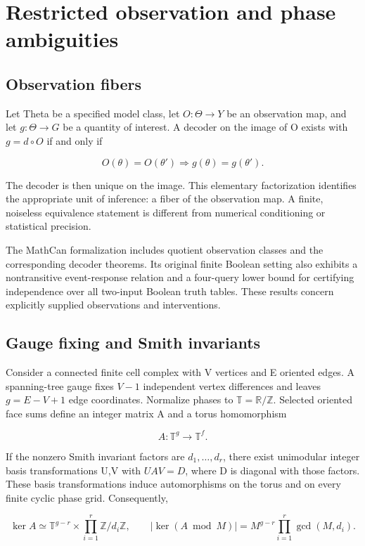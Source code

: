\documentclass[11pt,a4paper]{article}
\begin{document}
\section{Restricted observation and phase ambiguities}

\subsection{Observation fibers}

Let Theta be a specified model class, let $O:\Theta\to Y$ be an observation map, and let $g:\Theta\to G$ be a quantity of interest. A decoder on the image of O exists with $g=d\circ O$ if and only if

\[
O(\theta)=O(\theta')\Longrightarrow g(\theta)=g(\theta').
\]

The decoder is then unique on the image. This elementary factorization identifies the appropriate unit of inference: a fiber of the observation map. A finite, noiseless equivalence statement is different from numerical conditioning or statistical precision.

The MathCan formalization includes quotient observation classes and the corresponding decoder theorems. Its original finite Boolean setting also exhibits a nontransitive event-response relation and a four-query lower bound for certifying independence over all two-input Boolean truth tables. These results concern explicitly supplied observations and interventions.

\subsection{Gauge fixing and Smith invariants}

Consider a connected finite cell complex with V vertices and E oriented edges. A spanning-tree gauge fixes $V-1$ independent vertex differences and leaves $g=E-V+1$ edge coordinates. Normalize phases to $\mathbb T=\mathbb R/\mathbb Z$. Selected oriented face sums define an integer matrix A and a torus homomorphism

\[
A:\mathbb T^g\longrightarrow\mathbb T^f.
\]

If the nonzero Smith invariant factors are $d_1,\ldots,d_r$, there exist unimodular integer basis transformations U,V with $UAV=D$, where D is diagonal with those factors. These basis transformations induce automorphisms on the torus and on every finite cyclic phase grid. Consequently,

\[
\ker A\simeq \mathbb T^{g-r}\times \prod_{i=1}^r \mathbb Z/d_i\mathbb Z,
\qquad
|\ker(A\bmod M)|=M^{g-r}\prod_{i=1}^r\gcd(M,d_i).
\]
\end{document}

